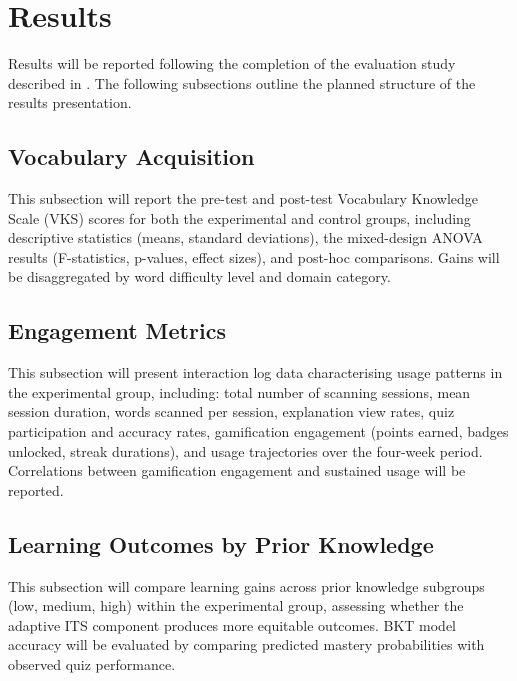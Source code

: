
\section{Results}
\label{sec:results}

Results will be reported following the completion of the evaluation study described in . The following subsections outline the planned structure of the results presentation.

\subsection{Vocabulary Acquisition}
\label{subsec:results_vocabulary}

This subsection will report the pre-test and post-test Vocabulary Knowledge Scale (VKS) scores for both the experimental and control groups, including descriptive statistics (means, standard deviations), the mixed-design ANOVA results (F-statistics, p-values, effect sizes), and post-hoc comparisons. Gains will be disaggregated by word difficulty level and domain category.

\subsection{Engagement Metrics}
\label{subsec:results_engagement}

This subsection will present interaction log data characterising usage patterns in the experimental group, including: total number of scanning sessions, mean session duration, words scanned per session, explanation view rates, quiz participation and accuracy rates, gamification engagement (points earned, badges unlocked, streak durations), and usage trajectories over the four-week period. Correlations between gamification engagement and sustained usage will be reported.

\subsection{Learning Outcomes by Prior Knowledge}
\label{subsec:results_outcomes}

This subsection will compare learning gains across prior knowledge subgroups (low, medium, high) within the experimental group, assessing whether the adaptive ITS component produces more equitable outcomes. BKT model accuracy will be evaluated by comparing predicted mastery probabilities with observed quiz performance.

